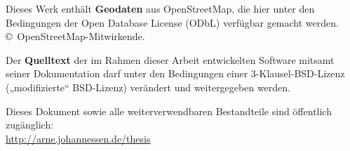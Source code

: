 {{\begin{description}[labelwidth=3.5em,leftmargin=4em,itemsep=1.5ex]
\item[\licensestack{\ccAttribution\kern0.1em\ccShareAlike}{ODbL}]
Dieses Werk enthält \textbf{Geodaten} aus OpenStreetMap, die hier unter den
Bedingungen der Open Database License (ODbL)  verfügbar
gemacht werden. \copyright~Open\-Street\-Map-Mit\-wir\-ken\-de.

\item[\licensestack{\ccAttribution}{BSD}]
Der \textbf{Quelltext} der im Rahmen dieser Arbeit entwickelten Software
mitsamt seiner Dokumentation darf unter den Bedingungen einer
3-Klausel-BSD-Lizenz („modifizierte“ BSD-Lizenz) verändert und weitergegeben
werden.

\end{description}


\noindent Dieses Dokument sowie alle weiterverwendbaren Bestandteile sind öffentlich zugänglich:\\
\url{http://arne.johannessen.de/thesis}



}\clearpage
}
